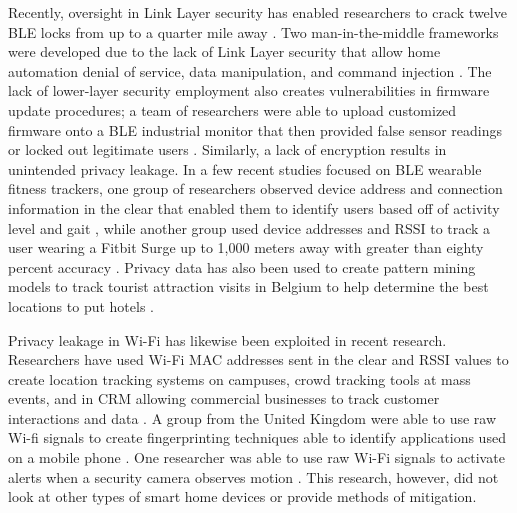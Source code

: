 \documentclass[12pt,letterpaper,oneside]{book}
\begin{document}
		Recently, oversight in Link Layer security has enabled researchers to crack twelve \ac{BLE} locks from up to a quarter mile away \cite{RoseLocks}. Two man-in-the-middle frameworks were developed due to the lack of Link Layer security that allow home automation denial of service, data manipulation, and command injection \cite{Jourdois}\cite{Slawomir}. The lack of lower-layer security employment also creates vulnerabilities in firmware update procedures; a team of researchers were able to upload customized firmware onto a \ac{BLE} industrial monitor that then provided false sensor readings or locked out legitimate users \cite{GuiterrezIndustrial}. Similarly, a lack of encryption results in unintended privacy leakage. In a few recent studies focused on \ac{BLE} wearable fitness trackers, one group of researchers observed device address and connection information in the clear that enabled them to identify users based off of activity level and gait \cite{Das}, while another group used device addresses and \ac{RSSI} to track a user wearing a Fitbit Surge up to 1,000 meters away with greater than eighty percent accuracy \cite{RoseTrack}. Privacy data has also been used to create pattern mining models to track tourist attraction visits in Belgium to help determine the best locations to put hotels \cite{Versichele}.
		
		Privacy leakage in Wi-Fi has likewise been exploited in recent research. Researchers have used Wi-Fi \ac{MAC} addresses sent in the clear and \ac{RSSI} values to create location tracking systems on campuses, crowd tracking tools at mass events, and in \ac{CRM} allowing commercial businesses to track customer interactions and data \cite{Zhou}\cite{Bonne}\cite{Atkinson}. A group from the United Kingdom were able to use raw Wi-fi signals to create fingerprinting techniques able to identify applications used on a mobile phone \cite{Atkinson}. One researcher was able to use raw Wi-Fi signals to activate alerts when a security camera observes motion \cite{Madrigal}. This research, however, did not look at other types of smart home devices or provide methods of mitigation.
		
\end{document}
